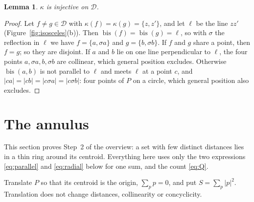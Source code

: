\documentclass[11pt]{article}
\newcommand{\cD}{\mathcal{D}}
\newcommand{\bis}{\operatorname{bis}}
\newtheorem{lemma}[theorem]{Lemma}
\theoremstyle{remark}
\begin{document}
\begin{lemma}\label{lem:kappa}
$\kappa$ is injective on $\cD$.
\end{lemma}

\begin{proof}
Let $f \ne g \in \cD$ with $\kappa(f) = \kappa(g) = \{z, z'\}$, and let
$\ell$ be the line $zz'$ (Figure~\ref{fig:isosceles}(b)). Then
$\bis(f) = \bis(g) = \ell$, so with $\sigma$ the reflection in $\ell$ we
have $f = \{a, \sigma a\}$ and $g = \{b, \sigma b\}$. If $f$ and $g$ share
a point, then $f = g$; so they are disjoint. If $a$ and $b$ lie on one
line perpendicular to $\ell$, the four points $a, \sigma a, b, \sigma b$
are collinear, which general position excludes. Otherwise $\bis(a,b)$ is
not parallel to $\ell$ and meets $\ell$ at a point $c$, and
$|ca| = |cb| = |c\sigma a| = |c\sigma b|$: four points of $P$ on a circle,
which general position also excludes.
\end{proof}

\section{The annulus}\label{sec:annulus}

This section proves Step~2 of the overview: a set with few distinct
distances lies in a thin ring around its centroid. Everything here uses
only the two expressions \eqref{eq:parallel} and \eqref{eq:radial} below
for one sum, and the count \eqref{eq:Q}.

Translate $P$ so that its centroid is the origin, $\sum_{p} p = 0$, and
put $S = \sum_p |p|^2$. Translation does not change distances, collinearity
or concyclicity.
\end{document}

